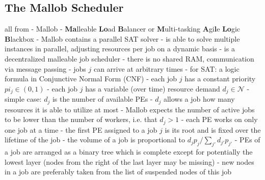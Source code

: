 \subsection{The Mallob Scheduler}
\label{prelim: mallob}
all from \cite{schreiber2021scalable}
- Mallob - \textbf{Ma}lleable \textbf{Lo}ad \textbf{B}alancer or \textbf{M}ulti-tasking \textbf{A}gi\textbf{l}e \textbf{Lo}gic \textbf{B}lackbox
- Mallob contains a parallel SAT solver
- is able to solve multiple instances in parallel, adjusting resources per job on a dynamic basis
- is a decentralized malleable job scheduler
- there is no shared RAM, communication via message passing
- jobs $j$ can arrive at arbitrary times
	- for SAT: a logic formula in Conjunctive Normal Form (CNF)
	- each job $j$ has a constant priority $pi_j \in (0, 1)$
	- each job $j$ has a variable (over time) resource demand $d_j \in \mathcal{N}$
		- simple case: $d_j$ is the number of available PEs
	- $d_j$ allows a job how many resources it is able to utilize at most
	- Mallob expects the number of active jobs to be lower than the number of workers, i.e. that $d_j > 1$
		- each PE works on only one job at a time
	- the first PE assigned to a job $j$ is its root and is fixed over the lifetime of the job
	- the volume of a job is proportional to $d_j p_j / \sum_{j'} d_{j'} p_{j'}$
	- PEs of a job are arranged as a binary tree which is complete except for potentially the lowest layer (nodes from the right of the last layer may be missing)
	- new nodes in a job are preferably taken from the list of suspended nodes of this job